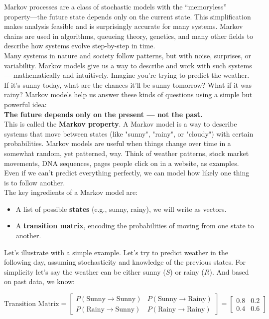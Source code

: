 \documentclass{book}
\begin{document}
Markov processes are a class of stochastic models with the “memoryless” property—the future state depends only on the current state. This simplification makes analysis feasible and is surprisingly accurate for many systems. Markov chains are used in algorithms, queueing theory, genetics, and many other fields to describe how systems evolve step-by-step in time.\\

Many systems in nature and society follow patterns, but with noise, surprises, or variability. Markov models give us a way to describe and work with such systems — mathematically and intuitively. Imagine you're trying to predict the weather. If it’s sunny today, what are the chances it’ll be sunny tomorrow? What if it was rainy? Markov models help us answer these kinds of questions using a simple but powerful idea:\\

\textbf{The future depends only on the present — not the past.}\\

This is called the \textbf{Markov property}. A Markov model is a way to describe systems that move between states (like "sunny", "rainy", or "cloudy") with certain probabilities. Markov models are useful when things change over time in a somewhat random, yet patterned, way. Think of weather patterns, stock market movements, DNA sequences, pages people click on in a website, as examples. Even if we can’t predict everything perfectly, we can model how likely one thing is to follow another.\\

The key ingredients of a Markov model are:
\begin{itemize}
  \item A list of possible \textbf{states} (e.g., sunny, rainy), we will write as vectors.
  \item A \textbf{transition matrix}, encoding the probabilities of moving from one state to another.
\end{itemize}

Let's illustrate with a simple example. Let's try to predict weather in the following day, assuming stochasticity and knowledge of the previous states. For simplicity let’s say the weather can be either sunny ($S$) or rainy ($R$). And based on past data, we know:

\[
\text{Transition Matrix} =
\begin{bmatrix}
P(\text{Sunny} \rightarrow \text{Sunny}) & P(\text{Sunny} \rightarrow \text{Rainy}) \\
P(\text{Rainy} \rightarrow \text{Sunny}) & P(\text{Rainy} \rightarrow \text{Rainy})
\end{bmatrix}
=
\begin{bmatrix}
0.8 & 0.2 \\
0.4 & 0.6
\end{bmatrix}
\]
\end{document}
